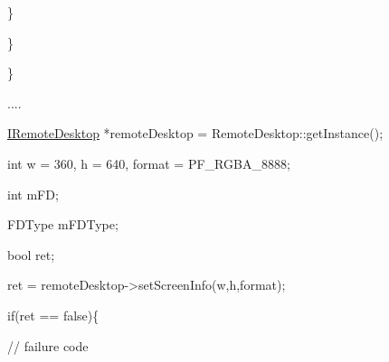 \begin{DoxyPre}			\}\end{DoxyPre}



\begin{DoxyPre}		  \}\end{DoxyPre}



\begin{DoxyPre}	   \}\end{DoxyPre}



\begin{DoxyPre}	 ....\end{DoxyPre}



\begin{DoxyPre}	 \hyperlink{classknoxremotedesktop_1_1IRemoteDesktop}{IRemoteDesktop} *remoteDesktop = RemoteDesktop::getInstance();\end{DoxyPre}



\begin{DoxyPre}	 int w = 360, h = 640, format = PF\_RGBA\_8888;\end{DoxyPre}



\begin{DoxyPre}	 int	  mFD;\end{DoxyPre}



\begin{DoxyPre}	 FDType   mFDType;\end{DoxyPre}



\begin{DoxyPre}	 bool ret;\end{DoxyPre}



\begin{DoxyPre}	 ret = remoteDesktop->setScreenInfo(w,h,format);\end{DoxyPre}



\begin{DoxyPre}	 if(ret == false)\{\end{DoxyPre}



\begin{DoxyPre}		 // failure code\end{DoxyPre}



